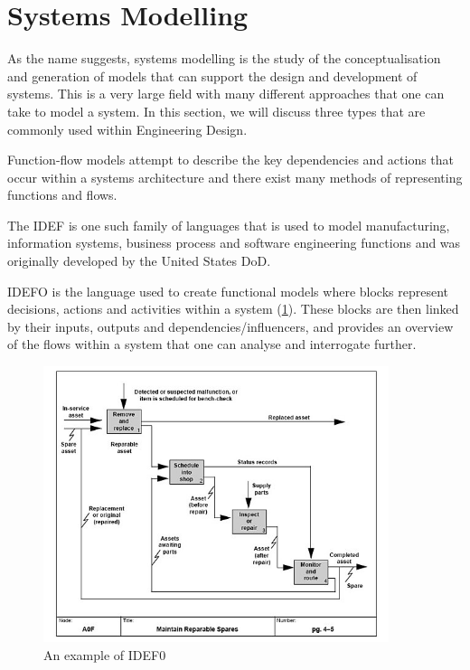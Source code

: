 \section{Systems Modelling}

As the name suggests, systems modelling is the study of the conceptualisation and generation of models that can support the design and development of systems. This is a very large field with many different approaches that one can take to model a system. In this section, we will discuss three types that are commonly used within Engineering Design.

Function-flow models attempt to describe the key dependencies and actions that occur within a systems architecture and there exist many methods of representing functions and flows.

The \ac{IDEF} is one such family of languages that is used to model manufacturing, information systems, business process and software engineering functions and was originally developed by the United States \ac{DoD}. 

IDEFO is the language used to create functional models where blocks represent decisions, actions and activities within a system (\cref{fig-idef0}). These blocks are then linked by their inputs, outputs and dependencies/influencers, and provides an overview of the flows within a system that one can analyse and interrogate further.

\begin{figure}[h!]
\centering
\includegraphics[width=0.9\textwidth]{figs/idef0.jpg}
\caption{An example of IDEF0}
\label{fig-idef0}
\end{figure}


